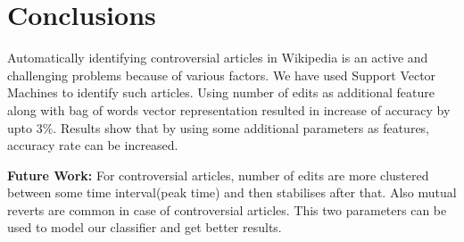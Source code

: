 \documentclass[twocolumn]{article}
\begin{document}
 \section{Conclusions}

 Automatically identifying controversial articles in Wikipedia 
 is an active and challenging problems because of various factors. 
 We have used Support Vector Machines to identify such articles. 
 Using number of edits as additional feature along with bag of 
 words vector representation resulted in increase of accuracy by 
 upto 3\%. Results show that by using some additional parameters 
 as features, accuracy rate can be increased.

 \textbf{Future Work: }For controversial articles, number of edits 
 are more clustered between some time interval(peak time) and then 
 stabilises after that. Also mutual reverts are common in case of 
 controversial articles. This two parameters can be used to model 
 our classifier and get better results.

 
 

 
\end{document}
